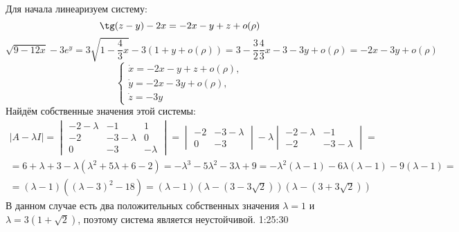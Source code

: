 \documentclass[11pt]{article}
\begin{document}
Для начала линеаризуем систему:
$$\tg(z - y) - 2x = -2x - y + z + o(\rho)$$
$$\sqrt{9 - 12x} - 3e^y = 3\sqrt{1 - \frac{4}3x} - 3(1 + y + o(\rho)) = 3 - \frac{3}2\frac{4}3x - 3 - 3y + o(\rho) = -2x - 3y + o(\rho)$$
\begin{equation*}
\begin{cases}
\dot x = -2x - y + z + o(\rho), \\
\dot y = -2x - 3y + o(\rho), \\
\dot z = -3y
\end{cases}
\end{equation*}
Найдём собственные значения этой системы:
\begin{multline*}
|A - \lambda I| =
\begin{vmatrix}
-2 - \lambda & -1           & 1 \\
-2           & -3 - \lambda & 0 \\
0            & -3           & -\lambda
\end{vmatrix}
= \begin{vmatrix}
-2 & -3 - \lambda \\
0  & -3
\end{vmatrix} - \lambda
\begin{vmatrix}
-2 - \lambda & -1 \\
-2           & -3 - \lambda
\end{vmatrix}
= \\
= 6 + \lambda + 3 - \lambda(\lambda^2 + 5\lambda + 6 - 2) = -\lambda^3- 5\lambda^2
- 3\lambda + 9 = -\lambda^2(\lambda - 1) - 6\lambda(\lambda - 1) - 9(\lambda - 1) = \\
= (\lambda - 1)((\lambda - 3)^2 - 18) = (\lambda - 1)(\lambda - (3 - 3\sqrt 2))(\lambda - (3 + 3\sqrt 2))
\end{multline*}
В данном случае есть два положительных собственных значения \(\lambda = 1\) и \(\lambda = 3(1 + \sqrt 2)\),
поэтому система является неустойчивой.
1:25:30
\end{document}
